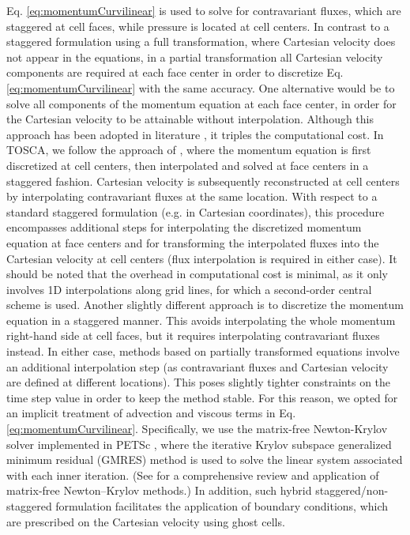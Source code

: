 \documentclass[journal abbreviation, manuscript]{copernicus}
\begin{document}
Eq. \ref{eq:momentumCurvilinear} is used to solve for contravariant fluxes, which are staggered at cell faces, while pressure is located at cell centers. In contrast to a staggered formulation using a full transformation, where Cartesian velocity does not appear in the equations, in a partial transformation all Cartesian velocity components are required at each face center in order to discretize Eq. \ref{eq:momentumCurvilinear} with the same accuracy. One alternative would be to solve all components of the momentum equation at each face center, in order for the Cartesian velocity to be attainable without interpolation. Although this approach has been adopted in literature \citep{1984_MaliskaRaithby}, it triples the computational cost. In TOSCA, we follow the approach of \cite{2007_GeSotiropoulos}, where the momentum equation is first discretized at cell centers, then interpolated and solved at face centers in a staggered fashion. Cartesian velocity is subsequently reconstructed at cell centers by interpolating contravariant fluxes at the same location. With respect to a standard staggered formulation (e.g. in Cartesian coordinates), this procedure encompasses additional steps for interpolating the discretized momentum equation at face centers and for transforming the interpolated fluxes into the Cartesian velocity at cell centers (flux interpolation is required in either case). It should be noted that the overhead in computational cost is minimal, as it only involves 1D interpolations along grid lines, for which a second-order central scheme is used. Another slightly different approach \citep{1992_RosenfeldEtAl} is to discretize the momentum equation in a staggered manner. This avoids interpolating the whole momentum right-hand side at cell faces, but it requires interpolating contravariant fluxes instead. In either case, methods based on partially transformed equations involve an additional interpolation step (as contravariant fluxes and Cartesian velocity are defined at different locations). This poses slightly tighter constraints on the time step value in order to keep the method stable. For this reason, we opted for an implicit treatment of advection and viscous terms in Eq. \ref{eq:momentumCurvilinear}. Specifically, we use the matrix-free Newton-Krylov solver implemented in PETSc \citep{petscUserRef}, where the iterative Krylov subspace generalized minimum residual (GMRES) method \citep{1986_SaadSchultz} is used to solve the linear system associated with each inner iteration. (See \citealp{2004_KnollKeyes} for a comprehensive review and application of matrix-free Newton–Krylov methods.) In addition, such hybrid staggered/non-staggered formulation facilitates the application of boundary conditions, which are prescribed on the Cartesian velocity using ghost cells. 
\end{document}
